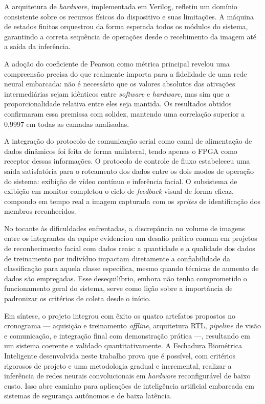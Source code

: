 A arquitetura de \textit{hardware}, implementada em Verilog, refletiu um domínio consistente sobre os recursos físicos do dispositivo e suas limitações. A máquina de estados finitos orquestrou da forma esperada todos os módulos do sistema, garantindo a correta sequência de operações desde o recebimento da imagem até a saída da inferência.

A adoção do coeficiente de Pearson como métrica principal revelou uma compreensão precisa do que realmente importa para a fidelidade de uma rede neural embarcada: não é necessário que os valores absolutos das ativações intermediárias sejam idênticos entre \textit{software} e \textit{hardware}, mas sim que a proporcionalidade relativa entre eles seja mantida. Os resultados obtidos confirmaram essa premissa com solidez, mantendo uma correlação superior a 0,9997 em todas as camadas analisadas. 

A integração do protocolo de comunicação serial como canal de alimentação de dados dinâmicos foi feita de forma unilateral, tendo apenas o FPGA como receptor dessas informações. O protocolo de controle de fluxo estabeleceu uma saída satisfatória para o roteamento dos dados entre os dois modos de operação do sistema: exibição de vídeo contínuo e inferência facial. O subsistema de exibição em monitor completou o ciclo de \textit{feedback} visual de forma eficaz, compondo em tempo real a imagem capturada com os \textit{sprites} de identificação dos membros reconhecidos.

No tocante às dificuldades enfrentadas, a discrepância no volume de imagens entre os integrantes da equipe evidenciou um desafio prático comum em projetos de reconhecimento facial com dados reais: a quantidade e a qualidade dos dados de treinamento por indivíduo impactam diretamente a confiabilidade da classificação para aquela classe específica, mesmo quando técnicas de aumento de dados são empregadas. Esse desequilíbrio, embora não tenha comprometido o funcionamento geral do sistema, serve como lição sobre a importância de padronizar os critérios de coleta desde o início.

Em síntese, o projeto integrou com êxito os quatro artefatos propostos no cronograma --- aquisição e treinamento \textit{offline}, arquitetura RTL, \textit{pipeline} de visão e comunicação, e integração final com demonstração prática ---, resultando em um sistema coerente e validado quantitativamente. A Fechadura Biométrica Inteligente desenvolvida neste trabalho prova que é possível, com critérios rigorosos de projeto e uma metodologia gradual e incremental, realizar a inferência de redes neurais convolucionais em \textit{hardware} reconfigurável de baixo custo. Isso abre caminho para aplicações de inteligência artificial embarcada em sistemas de segurança autônomos e de baixa latência.

